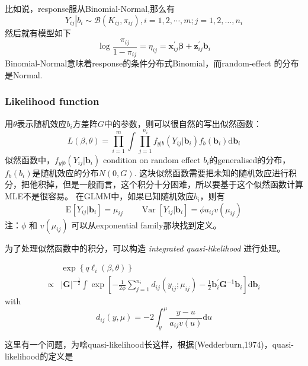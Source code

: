 \documentclass[
]{book}
\theoremstyle{definition}
\theoremstyle{definition}
\theoremstyle{definition}
\theoremstyle{remark}
\begin{document}
比如说，response服从Binomial-Normal,那么有
\[
Y_{i j}\left|b_{i} \sim \mathcal{B}\left(K_{i j}, \pi_{i j}\right), i=1,2, \cdots, m ; j=1,2, \dots, n_{i}\right.
\]
然后就有模型如下
\[
\log \frac{\pi_{i j}}{1-\pi_{i j}}=\eta_{i j}=\boldsymbol{x}_{i j}^{\prime} \boldsymbol{\beta}+\boldsymbol{z}_{i j}^{\prime} \boldsymbol{b}_{i}
\]
Binomial-Normal意味着response的条件分布式Binomial，而random-effect 的分布是Normal.

\hypertarget{likelihood-function}{%
\subsubsection{Likelihood function}\label{likelihood-function}}

用\(\theta\)表示随机效应\(b_i\)方差阵\(G\)中的参数，则可以很自然的写出似然函数：
\[
L(\beta, \theta)=\prod_{i=1}^{m} \int \prod_{j=1}^{n_{i}} f_{y|b}\left(Y_{i j} | \mathbf{b}_{i}\right) f_{b}\left(\mathbf{b}_{i}\right) \mathrm{d} \mathbf{b}_{i}
\]
似然函数中，\(f_{y|b}\left(Y_{i j} | \mathbf{b}_{i}\right)\) condition on random effect \(b_i\)的generalised的分布，\(f_b(b_i)\)是随机效应的分布\(N(0,G)\).
这块似然函数需要把未知的随机效应进行积分，把他积掉，但是一般而言，这个积分十分困难，所以要基于这个似然函数计算MLE不是很容易。
在GLMM中，如果已知随机效应\(b_i\)，则有
\[
\mathrm{E}\left[Y_{i j} | \mathbf{b}_{i}\right]=\mu_{i j} \quad \quad \operatorname{Var}\left[Y_{i j} | \mathbf{b}_{i}\right]=\phi a_{i j} v\left(\mu_{i j}\right)
\]
注：\(\phi\) 和 \(v(\mu_{ij})\) 可以从exponential family那块找到定义。

为了处理似然函数中的积分，可以构造 \emph{integrated quasi-likelihood} 进行处理。

\[
\begin{equation}
\begin{aligned}
& \exp \left\{q \ell_{i}(\beta, \theta)\right\} \\ \propto &|\mathbf{G}|^{-\frac{1}{2}} \int \exp \left[-\frac{1}{2 \phi} \sum_{j=1}^{n_{i}} d_{i j}\left(y_{i j} ; \mu_{i j}\right)-\frac{1}{2} \mathbf{b}_{i}^{\prime} \mathbf{G}^{-1} \mathbf{b}_{i}\right] \mathrm{d} \mathbf{b}_{i} 
\end{aligned}
\label{eq:intQuasi}
\end{equation}
\]
with
\[
d_{i j}(y, \mu)=-2 \int_{y}^{\mu} \frac{y-u}{a_{i j} v(u)} \mathrm{d} u
\]

这里有一个问题，为啥quasi-likelihood长这样，根据(Wedderburn,1974)，quasi-likelihood的定义是
\end{document}
